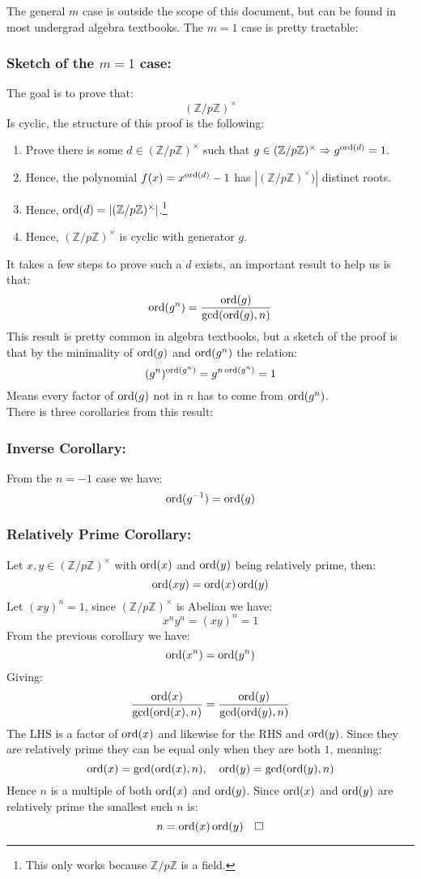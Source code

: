 The general $m$ case is outside the scope of this document,
but can be found in most undergrad algebra textbooks.
The $m = 1$ case is pretty tractable:

\subsubsection{Sketch of the $m = 1$ case:}
The goal is to prove that:
\[(\mathbb{Z}/p\mathbb{Z})^\times\]
Is cyclic, the structure of this proof is the following:
\begin{enumerate}
	\item Prove there is some $d\in(\mathbb{Z}/p\mathbb{Z})^\times$ such that $g\in(\mathbb{Z}/p\mathbb{Z})^\times \Rightarrow g^{\operatorname{ord}(d)}=1$.
	\item Hence, the polynomial $f(x)=x^{\operatorname{ord}(d)}-1$ has $|(\mathbb{Z}/p\mathbb{Z})^\times)|$ distinct roots.
	\item Hence, $\operatorname{ord}(d)=|(\mathbb{Z}/p\mathbb{Z})^\times|$.\footnote{This only works because $\mathbb{Z}/p\mathbb{Z}$ is a field.}
	\item Hence, $(\mathbb{Z}/p\mathbb{Z})^\times$ is cyclic with generator $g$.
\end{enumerate}
It takes a few steps to prove such a $d$ exists,
an important result to help us is that:
\[\operatorname{ord}(g^n) = \frac{\operatorname{ord}(g)}{\gcd(\operatorname{ord}(g),n)}\]
This result is pretty common in algebra textbooks, 
but a sketch of the proof is that by the minimality of $\operatorname{ord}(g)$ and $\operatorname{ord}(g^n)$ the relation:
\[(g^{n})^{\operatorname{ord}(g^n)} = g^{n\operatorname{ord}(g^n)}=1\] 
Means every factor of $\operatorname{ord}(g)$ not in $n$ has to come from $\operatorname{ord}(g^n)$.
\\
There is three corollaries from this result:

\subsubsection{Inverse Corollary:}
From the $n=-1$ case we have:
\[\operatorname{ord}(g^{-1})=\operatorname{ord}(g)\]

\subsubsection{Relatively Prime Corollary:}
Let $x,y\in(\mathbb{Z}/p\mathbb{Z})^\times$ with $\operatorname{ord}(x)$ and $\operatorname{ord}(y)$ being relatively prime,
then:
\[\operatorname{ord}(xy) = \operatorname{ord}(x)\operatorname{ord}(y)\]
Let $(xy)^n=1$, since $(\mathbb{Z}/p\mathbb{Z})^\times$ is Abelian we have:
\[x^ny^n = (xy)^n=1\]
From the previous corollary we have:
\[\operatorname{ord}(x^n) = \operatorname{ord}(y^n)\]
Giving:
\[\frac{\operatorname{ord}(x)}{\gcd(\operatorname{ord}(x),n)}=\frac{\operatorname{ord}(y)}{\gcd(\operatorname{ord}(y),n)}\]
The LHS is a factor of $\operatorname{ord}(x)$ and likewise for the RHS and $\operatorname{ord}(y)$.
Since they are relatively prime they can be equal only when they are both $1$,
meaning:
\[\operatorname{ord}(x) = \gcd(\operatorname{ord}(x),n),\quad\operatorname{ord}(y)=\gcd(\operatorname{ord}(y),n)\]
Hence $n$ is a multiple of both $\operatorname{ord}(x)$ and $\operatorname{ord}(y)$.
Since $\operatorname{ord}(x)$ and $\operatorname{ord}(y)$ are relatively prime the smallest such $n$ is:
\[n=\operatorname{ord}(x)\operatorname{ord}(y)\quad\square\]

